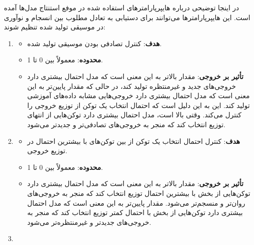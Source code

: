در اینجا توضیحی درباره هایپرپارامترهای استفاده شده در موفع استنتاج مدل‌ها آمده است. این
هایپرپارامترها می‌توانند برای دستیابی به تعادل مطلوب بین انسجام و
نوآوری در موسیقی تولید شده تنظیم شوند:

\begin{enumerate}
      \def\labelenumi{\arabic{enumi}.}
      \item
            \textbf{ }

            \begin{itemize}
                  \item
                        \textbf{هدف}: کنترل تصادفی بودن موسیقی تولید شده.
                  \item
                        \textbf{محدوده}: معمولاً بین 0 تا 1.
                  \item
                        \textbf{تأثیر بر خروجی}: مقدار   بالاتر به این معنی است که مدل
                        احتمال بیشتری دارد خروجی‌های جدید و غیرمنتظره تولید کند، در حالی که
                        مقدار   پایین‌تر به این معنی است که مدل احتمال بیشتری دارد
                        خروجی‌هایی مشابه داده‌های آموزشی تولید کند. این به این دلیل است که  
                        احتمال انتخاب یک توکن از توزیع خروجی را کنترل می‌کند. وقتی   بالا
                        است، مدل احتمال بیشتری دارد توکن‌هایی از انتهای توزیع انتخاب کند که
                        منجر به خروجی‌های تصادفی‌تر و جدیدتر می‌شود.
            \end{itemize}
      \item
            \textbf{}

            \begin{itemize}
                  \item
                        \textbf{هدف}: کنترل احتمال انتخاب یک توکن از بین توکن‌های با بیشترین
                        احتمال در توزیع خروجی.
                  \item
                        \textbf{محدوده}: معمولاً بین 0 تا 1.
                  \item
                        \textbf{تأثیر بر خروجی}: مقدار  بالاتر به این معنی است که مدل
                        احتمال بیشتری دارد توکن‌هایی از بخش با بیشترین احتمال توزیع انتخاب
                        کند که منجر به خروجی‌های روان‌تر و منسجم‌تر می‌شود. مقدار  پایین‌تر
                        به این معنی است که مدل احتمال بیشتری دارد توکن‌هایی از بخش با احتمال
                        کمتر توزیع انتخاب کند که منجر به خروجی‌های جدیدتر و غیرمنتظره‌تر
                        می‌شود.
            \end{itemize}
      \item
            \textbf{}


\end{enumerate}
